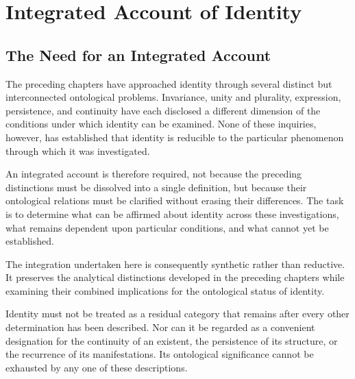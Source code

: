 
\section{Integrated Account of Identity}
\label{sec:integrated-account-of-identity}


\subsection{The Need for an Integrated Account}

The preceding chapters have approached identity through several
distinct but interconnected ontological problems. Invariance,
unity and plurality, expression, persistence, and continuity
have each disclosed a different dimension of the conditions
under which identity can be examined. None of these inquiries,
however, has established that identity is reducible to the
particular phenomenon through which it was investigated.

An integrated account is therefore required, not because the
preceding distinctions must be dissolved into a single
definition, but because their ontological relations must be
clarified without erasing their differences. The task is to
determine what can be affirmed about identity across these
investigations, what remains dependent upon particular
conditions, and what cannot yet be established.

The integration undertaken here is consequently synthetic
rather than reductive. It preserves the analytical distinctions
developed in the preceding chapters while examining their
combined implications for the ontological status of identity.

Identity must not be treated as a residual category that
remains after every other determination has been described.
Nor can it be regarded as a convenient designation for the
continuity of an existent, the persistence of its structure,
or the recurrence of its manifestations. Its ontological
significance cannot be exhausted by any one of these
descriptions.

